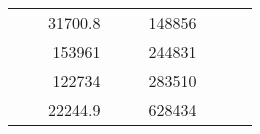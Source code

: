 \begin{table}[H]
\begin{tabular}{|ccrccrccc}
\multicolumn{1}{|c|}{\cellcolor[HTML]{FFFFC7}}                                & \multicolumn{1}{c|}{\cellcolor[HTML]{DDFDFF}}                      & \multicolumn{1}{r|}{\cellcolor[HTML]{DAE8FC}31700.8}   & \multicolumn{1}{c|}{\cellcolor[HTML]{FFFFC7}}                                & \multicolumn{1}{c|}{\cellcolor[HTML]{DDFDFF}}                       & \multicolumn{1}{r|}{\cellcolor[HTML]{DDFDFF}148856}    &                                                                              &                                                                    &                                                        \\ \cline{3-3} \cline{6-6}
\multicolumn{1}{|c|}{\cellcolor[HTML]{FFFFC7}}                                & \multicolumn{1}{c|}{\cellcolor[HTML]{DDFDFF}}                      & \multicolumn{1}{r|}{\cellcolor[HTML]{DDFDFF}153961}    & \multicolumn{1}{c|}{\cellcolor[HTML]{FFFFC7}}                                & \multicolumn{1}{c|}{\cellcolor[HTML]{DDFDFF}}                       & \multicolumn{1}{r|}{\cellcolor[HTML]{DAE8FC}244831}    &                                                                              &                                                                    &                                                        \\ \cline{3-3} \cline{6-6}
\multicolumn{1}{|c|}{\cellcolor[HTML]{FFFFC7}}                                & \multicolumn{1}{c|}{\cellcolor[HTML]{DDFDFF}}                      & \multicolumn{1}{r|}{\cellcolor[HTML]{DAE8FC}122734}    & \multicolumn{1}{c|}{\cellcolor[HTML]{FFFFC7}}                                & \multicolumn{1}{c|}{\cellcolor[HTML]{DDFDFF}}                       & \multicolumn{1}{r|}{\cellcolor[HTML]{DDFDFF}283510}    &                                                                              &                                                                    &                                                        \\ \cline{3-3} \cline{6-6}
\multicolumn{1}{|c|}{\cellcolor[HTML]{FFFFC7}}                                & \multicolumn{1}{c|}{\cellcolor[HTML]{DDFDFF}}                      & \multicolumn{1}{r|}{\cellcolor[HTML]{DDFDFF}22244.9}   & \multicolumn{1}{c|}{\cellcolor[HTML]{FFFFC7}}                                & \multicolumn{1}{c|}{\cellcolor[HTML]{DDFDFF}}                       & \multicolumn{1}{r|}{\cellcolor[HTML]{DAE8FC}628434}    &                                                                              &                                                                    &                                                        \\ \cline{3-3} \cline{6-6}

\end{tabular}
\end{table}
